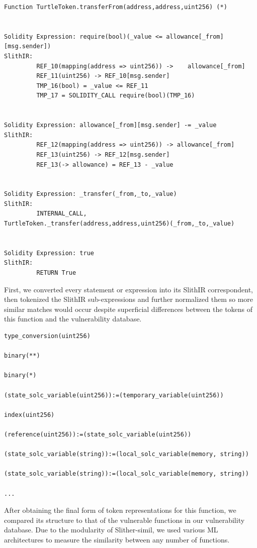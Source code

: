   \begin{lstlisting}[float,caption= The same function with its SlithIR expressions printed out., escapechar=\%, language=Solidity, label=lst:solidity-bug]
Function TurtleToken.transferFrom(address,address,uint256) (*)
 
 
Solidity Expression: require(bool)(_value <= allowance[_from][msg.sender])
SlithIR: 
         REF_10(mapping(address => uint256)) ->    allowance[_from]
         REF_11(uint256) -> REF_10[msg.sender]
         TMP_16(bool) = _value <= REF_11
         TMP_17 = SOLIDITY_CALL require(bool)(TMP_16)
 
 
Solidity Expression: allowance[_from][msg.sender] -= _value
SlithIR: 
         REF_12(mapping(address => uint256)) -> allowance[_from]
         REF_13(uint256) -> REF_12[msg.sender]
         REF_13(-> allowance) = REF_13 - _value
 
 
Solidity Expression: _transfer(_from,_to,_value)
SlithIR: 
         INTERNAL_CALL,      TurtleToken._transfer(address,address,uint256)(_from,_to,_value)
 
 
Solidity Expression: true
SlithIR: 
         RETURN True
    \end{lstlisting}


First, we converted every statement or expression into its SlithIR correspondent, then tokenized the SlithIR sub-expressions and further normalized them so more similar matches would occur
despite superficial differences between the tokens of this function and the vulnerability database.

\begin{lstlisting}[float,caption= Normalized SlithIR tokens of the previous expressions., escapechar=\%, language=Solidity, label=lst:solidity-bug]
type_conversion(uint256)
 
binary(**)
 
binary(*)
 
(state_solc_variable(uint256)):=(temporary_variable(uint256))
 
index(uint256)
 
(reference(uint256)):=(state_solc_variable(uint256))
 
(state_solc_variable(string)):=(local_solc_variable(memory, string))
 
(state_solc_variable(string)):=(local_solc_variable(memory, string))
 
...
  \end{lstlisting}

After obtaining the final form of token representations for this function, we compared its structure to that of the vulnerable functions in our vulnerability database.
Due to the modularity of Slither-simil, we used various ML architectures to measure the similarity between any number of functions.

